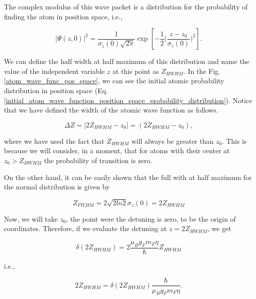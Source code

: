 \documentclass{article}
\begin{document}
The complex modulus of this wave packet is a distribution for the probability of finding the atom in position space, i.e.,

\begin{equation}\label{initial_atom_wave_function_position_space_probability_distribution}
    |\Psi (z, 0)|^{2} = \frac{1}{\sigma_{z}(0) \sqrt{2 \pi}} \exp \left[-\frac{1}{2}\bigg(\frac{z-z_{0}}{\sigma_{z}(0)}\bigg)^{2} \right].
\end{equation}

We can define the half width at half maximum of this distribution and name the value of the independent variable $z$ at this point as $Z_{HWHM}$. In the Fig. \ref{atom_wave_func_pos_space}, we can see the initial atomic probability distribution in position space (Eq. \ref{initial_atom_wave_function_position_space_probability_distribution}). Notice that we have defined the width of the atomic wave function as follows.

\begin{equation}\label{width_atomic_wave_function}
  \Delta Z = |2Z_{HWHM} - z_{0}| = (2Z_{HWHM} - z_{0}),
\end{equation}

where we have used the fact that $Z_{HWHM}$ will always be greater than $z_{0}$. This is because we will consider, in a moment, that for atoms with their center at $z_{0} > Z_{HWHM}$ the probability of transition is zero.

On the other hand, it can be easily shown that the full with at half maximum for the normal distribution is given by

\begin{equation}\label{FWHM_normal_distribution}
Z_{FWHM} = 2\sqrt{2ln2} \sigma_{z}(0) = 2 Z_{HWHM}
\end{equation}

Now, we will take $z_{0}$, the point were the detuning is zero, to be the origin of coordinates. Therefore, if we evaluate the detuning at $z = 2Z_{HWHM}$, we get

\begin{equation}
  \delta (2Z_{HWHM}) = 2\frac{\mu_{B} g_{F} m_{F} \eta}{\hbar} Z_{HWHM}
\end{equation}

i.e.,

\begin{equation}\label{position_at_zhwhm}
  2Z_{HWHM} = \delta (2Z_{HWHM}) \frac{\hbar}{\mu_{B} g_{F} m_{F} \eta}.
\end{equation}
\end{document}
